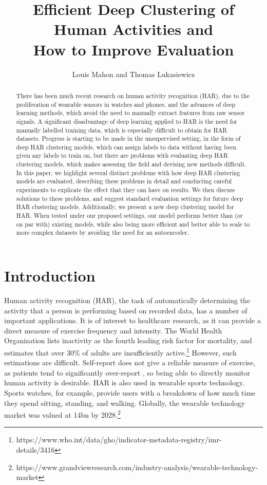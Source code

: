 \documentclass[wcp]{jmlr}
\title{Efficient Deep Clustering of Human Activities and\\ How to Improve Evaluation}
\author{Louis Mahon and Thomas Lukasiewicz}
\begin{document}
\maketitle

\begin{abstract}
There has been much recent research on human activity re\-cog\-ni\-tion (HAR), due to the proliferation of wearable sensors in watches and phones, and the advances of deep learning methods, which avoid the need to manually extract features from raw sensor signals. A significant disadvantage of deep learning applied to HAR is the need for  manually labelled training data, which is especially difficult to obtain for HAR datasets. Progress is starting to be made in the unsupervised setting, in the form of deep HAR clustering models, which can assign labels to data without having been given any labels to train on, but there are problems with evaluating deep HAR clustering models, which makes assessing the field and devising new methods difficult. In this paper, we highlight several distinct problems with how deep HAR clustering models are evaluated, describing these problems in detail and conducting careful experiments to explicate the effect that they can have on results. We then discuss solutions to these problems, and suggest standard evaluation settings for future deep HAR clustering models. Additionally, we present a new deep clustering model for HAR. When tested under our proposed settings, our model performs better than (or on par with) existing models, while also being more efficient and better able to scale to more complex datasets by avoiding the need for an autoencoder.    
\end{abstract}




\section{Introduction}
Human activity recognition (HAR), the task of automatically determining the activity that a person is performing based on recorded data, has a number of important applications. It is of interest to healthcare research, as it can provide a direct measure of exercise frequency and intensity. The World Health Organization lists inactivity as the fourth leading risk factor for mortality, and estimates that over 30\% of adults are insufficiently active.\footnote{https://www.who.int/data/gho/indicator-metadata-registry/imr-details/3416} However, such estimations are difficult. Self-report does not give a reliable measure of exercise, as patients tend to significantly over-report \citep{mcconnell2018mobile}, so being able to directly monitor human activity is desirable. HAR is also used in wearable sports technology. Sports watches, for example, provide users with a breakdown of how much time they spend sitting, standing, and walking. Globally, the wearable technology market was valued at \114bn by 2028.\footnote{https://www.grandviewresearch.com/industry-analysis/wearable-technology-market} 
\end{document}
